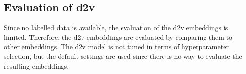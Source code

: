 \subsection*{Evaluation of \ac{d2v}}\label{subsec:evaluation-doc2vec}

Since no labelled data is available, the evaluation of the \ac{d2v} embeddings is limited.
Therefore, the \ac{d2v} embeddings are evaluated by comparing them to other embeddings.
The \ac{d2v} model is not tuned in terms of hyperparameter selection,
but the default settings are used since there is no way to evaluate the resulting embeddings.
